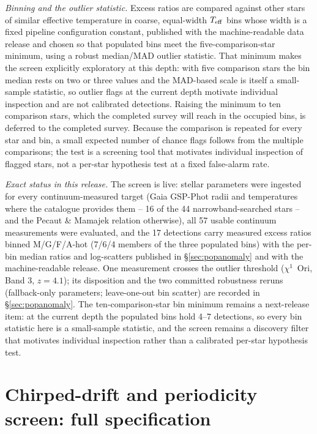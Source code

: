 \documentclass{openjournal}
\begin{document}
\emph{Binning and the outlier statistic.} Excess ratios are compared
against other stars of similar effective temperature in coarse,
equal-width $T_{\rm eff}$ bins whose width is a fixed pipeline
configuration constant, published with the machine-readable data
release and chosen so that populated bins meet the
five-comparison-star minimum, using a robust median/MAD outlier
statistic. That minimum makes the screen explicitly exploratory at
this depth: with five comparison stars the bin median rests on two or
three values and the MAD-based scale is itself a small-sample
statistic, so outlier flags at the current depth motivate individual
inspection and are not calibrated detections. Raising the minimum to
ten comparison stars, which the completed survey will reach in the
occupied bins, is deferred to the completed survey. Because the
comparison is repeated for every star and bin, a small expected number
of chance flags follows from the multiple comparisons; the test is a
screening tool that motivates individual inspection of flagged stars,
not a per-star hypothesis test at a fixed false-alarm rate.

\emph{Exact status in this release.} The screen is live: stellar
parameters were ingested for every continuum-measured target (Gaia
GSP-Phot radii and temperatures where the catalogue provides them --
16 of the 44 narrowband-searched stars -- and the Pecaut \& Mamajek
relation otherwise), all 57 usable continuum measurements were
evaluated, and the 17 detections carry measured excess ratios binned
M/G/F/A-hot (7/6/4 members of the three populated bins) with the
per-bin median ratios and log-scatters published in
\S\ref{sec:popanomaly} and with the machine-readable release. One
measurement crosses the outlier threshold ($\chi^1$~Ori, Band 3,
$z=4.1$); its disposition and the two committed robustness reruns
(fallback-only parameters; leave-one-out bin scatter) are recorded in
\S\ref{sec:popanomaly}. The ten-comparison-star bin minimum remains a
next-release item: at the current depth the populated bins hold 4--7
detections, so every bin statistic here is a small-sample statistic,
and the screen remains a discovery filter that motivates individual
inspection rather than a calibrated per-star hypothesis test.

\section{Chirped-drift and periodicity screen: full specification}
\label{app:extended}
\end{document}
